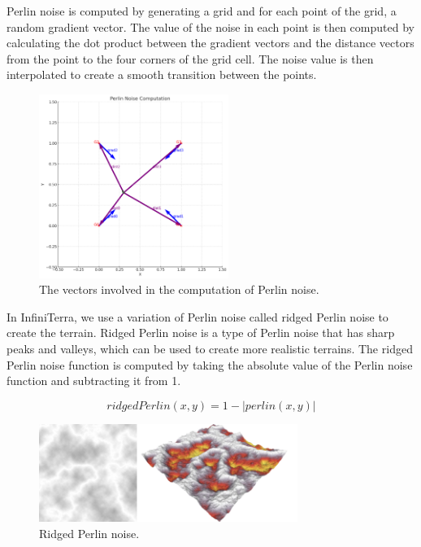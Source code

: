 \documentclass{article}
\begin{document}
Perlin noise is computed by generating a grid and for each point of the grid, a random gradient
vector. The value of the noise in each point is then computed by calculating the dot product
between the gradient vectors and the distance vectors from the point to the four corners of the
grid cell. The noise value is then interpolated to create a smooth transition between the points.

\begin{figure}[H]
	\centering
	\includegraphics[width=0.55\textwidth]{img/perlin.png}
	\caption{The vectors involved in the computation of Perlin noise.}
	\label{fig:perlin_vectors}
\end{figure}

In InfiniTerra, we use a variation of Perlin noise called ridged Perlin noise to create the terrain.
Ridged Perlin noise is a type of Perlin noise that has sharp peaks and valleys, which can be used to
create more realistic terrains. The ridged Perlin noise function is computed by taking the absolute
value of the Perlin noise function and subtracting it from 1.

$$ ridgedPerlin(x, y) = 1 - |perlin(x, y)| $$

\begin{figure}[H]
	\centering
	\includegraphics[width=0.75\textwidth]{img/ridged_perlin.png}
	\caption{Ridged Perlin noise.}
	\label{fig:rnoise}
\end{figure}
\end{document}
